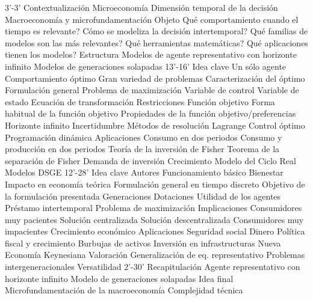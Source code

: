 \documentclass{nuevotema}
\begin{document}
\begin{esquema}[enumerate]
	\1[]  3'-3'
		\2 Contextualización
			\3 Microeconomía
			\3 Dimensión temporal de la decisión
			\3 Macroeconomía y microfundamentación
		\2 Objeto
			\3 Qué comportamiento cuando el tiempo es relevante?
			\3 Cómo se modeliza la decisión intertemporal?
			\3 Qué familias de modelos son las más relevantes?
			\3 Qué herramientas matemáticas?
			\3 Qué aplicaciones tienen los modelos?
		\2 Estructura
			\3 Modelos de agente representativo con horizonte infinito
			\3 Modelos de generaciones solapadas
	\1  13'-16'
		\2 Idea clave
			\3 Un sólo agente
			\3 Comportamiento óptimo
			\3 Gran variedad de problemas
			\3 Caracterización del óptimo
		\2 Formulación general
			\3 Problema de maximización
			\3 Variable de control
			\3 Variable de estado
			\3 Ecuación de transformación
			\3 Restricciones
			\3 Función objetivo
			\3 Forma habitual de la función objetivo
			\3 Propiedades de la función objetivo/preferencias
			\3 Horizonte infinito
			\3 Incertidumbre
		\2 Métodos de resolución
			\3 Lagrange
			\3 Control óptimo
			\3 Programación dinámica
		\2 Aplicaciones
			\3 Consumo en dos periodos
			\3 Consumo y producción en dos periodos
			\3 Teoría de la inversión de Fisher
			\3 Teorema de la separación de Fisher
			\3 Demanda de inversión
			\3 Crecimiento
			\3 Modelo del Ciclo Real
			\3 Modelos DSGE
	\1 12'-28'
		\2 Idea clave
			\3 Autores
			\3 Funcionamiento básico
			\3 Bienestar
			\3 Impacto en economía teórica
		\2 Formulación general en tiempo discreto
			\3 Objetivo de la formulación presentada
			\3 Generaciones
			\3 Dotaciones
			\3 Utilidad de los agentes
			\3 Préstamo intertemporal
			\3 Problema de maximización
		\2 Implicaciones
			\3 Consumidores muy pacientes
			\3 Solución centralizada
			\3 Solución descentralizada
			\3 Consumidores muy impacientes
			\3 Crecimiento económico
		\2 Aplicaciones
			\3 Seguridad social
			\3 Dinero
			\3 Política fiscal y crecimiento
			\3 Burbujas de activos
			\3 Inversión en infrastructuras
			\3 Nueva Economía Keynesiana
		\2 Valoración
			\3 Generalización de eq. representativo
			\3 Problemas intergeneracionales
			\3 Versatilidad
	\1[]  2'-30'
		\2 Recapitulación
			\3 Agente representativo con horizonte infinito
			\3 Modelo de generaciones solapadas
		\2 Idea final
			\3 Microfundamentación de la macroeconomía
			\3 Complejidad técnica

\end{esquema}
\end{document}
